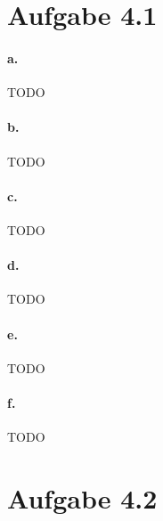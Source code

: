 \documentclass{article}
\begin{document}
	
	
	
	
	
	\section*{Aufgabe 4.1}
		\paragraph*{a.}
			TODO
			
		\paragraph*{b.}
			TODO
			
		\paragraph*{c.}
			TODO
			
		\paragraph*{d.}
			TODO
		
		\paragraph*{e.}
			TODO
		
		\paragraph*{f.}
			TODO
	
		\pagebreak
	
	\section*{Aufgabe 4.2}
\end{document}
